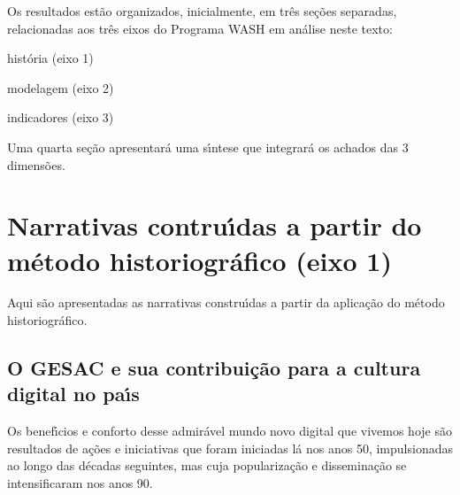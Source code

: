 \documentclass[
12pt,		%
openright,	%
twoside,  %
a4paper,			%
chapter=TITLE,		%
english,			%
french,				%
spanish,			%
brazil				%
]{USPSC-classe/USPSC}
\begin{document}
Os resultados est\~ao organizados, inicialmente, em tr\^es se\c{c}\~oes separadas, relacionadas aos tr\^es eixos do Programa WASH em an\'alise neste texto:










\begin{alineas}
\item hist\'oria (eixo 1)
\item modelagem (eixo 2)
\item indicadores (eixo 3)
\end{alineas}

Uma quarta se\c{c}\~ao apresentar\'a uma s\'{\i}ntese que integrar\'a os achados das 3 dimens\~oes.









\section[Narrativas contru\'{\i}das a partir do m\'etodo historiogr\'afico (eixo 1)]{Narrativas contru\'{\i}das a partir do m\'etodo historiogr\'afico (eixo 1)}\label{Narrativas contru\'{\i}das a partir do m\'etodo historiogr\'afico (eixo 1)}
Aqui s\~ao apresentadas as narrativas constru\'{\i}das a partir da aplica\c{c}\~ao do m\'etodo historiogr\'afico.









\subsection[O GESAC e sua contribui\c{c}\~ao para  a cultura  digital  no pa\'{\i}s]{O GESAC e sua contribui\c{c}\~ao para  a cultura  digital  no pa\'{\i}s}\label{O GESAC e sua contribui\c{c}\~ao para  a cultura  digital  no pa\'{\i}s}
Os benef\'{\i}cios e conforto desse admir\'avel mundo novo digital que vivemos hoje s\~ao resultados de a\c{c}\~oes e iniciativas que foram iniciadas l\'a nos anos 50, impulsionadas ao longo das d\'ecadas seguintes, mas cuja populariza\c{c}\~ao e dissemina\c{c}\~ao se intensificaram nos anos 90.
\end{document}
